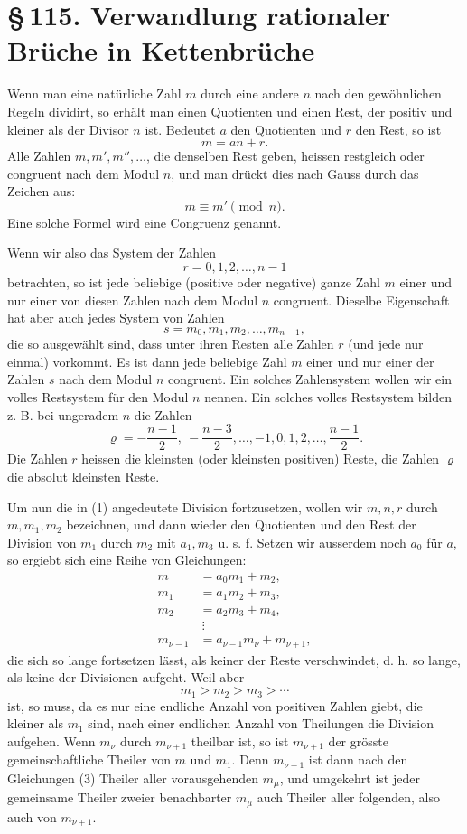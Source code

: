 \documentclass[11pt]{article}
\providecommand{\sect}[2]{\section*{\S\,#1. #2}}
\begin{document}
\sect{115}{Verwandlung rationaler Brüche in Kettenbrüche}

Wenn man eine natürliche Zahl $m$ durch eine andere $n$ nach den gewöhnlichen Regeln dividirt, so erhält man einen Quotienten und einen Rest, der positiv und kleiner als der Divisor $n$ ist. Bedeutet $a$ den Quotienten und $r$ den Rest, so ist
\begin{equation}
        m=an+r.
\tag{1}
\end{equation}
Alle Zahlen $m,m',m'',\ldots$, die denselben Rest geben, heissen restgleich oder congruent nach dem Modul $n$, und man drückt dies nach Gauss durch das Zeichen aus:
\begin{equation}
        m\equiv m'\pmod n.
\tag{2}
\end{equation}
Eine solche Formel wird eine Congruenz genannt.

Wenn wir also das System der Zahlen
\[
        r=0,1,2,\ldots,n-1
\]
betrachten, so ist jede beliebige (positive oder negative) ganze Zahl $m$ einer und nur einer von diesen Zahlen nach dem Modul $n$ congruent. Dieselbe Eigenschaft hat aber auch jedes System von Zahlen
\[
        s=m_0,m_1,m_2,\ldots,m_{n-1},
\]
die so ausgewählt sind, dass unter ihren Resten alle Zahlen $r$ (und jede nur einmal) vorkommt. Es ist dann jede beliebige Zahl $m$ einer und nur einer der Zahlen $s$ nach dem Modul $n$ congruent. Ein solches Zahlensystem wollen wir ein volles Restsystem für den Modul $n$ nennen. Ein solches volles Restsystem bilden z. B. bei ungeradem $n$ die Zahlen
\[
        \varrho=-\frac{n-1}{2},\ -\frac{n-3}{2},\ldots,-1,0,1,2,\ldots,\frac{n-1}{2}.
\]
Die Zahlen $r$ heissen die kleinsten (oder kleinsten positiven) Reste, die Zahlen $\varrho$ die absolut kleinsten Reste.

Um nun die in (1) angedeutete Division fortzusetzen, wollen wir $m,n,r$ durch $m,m_1,m_2$ bezeichnen, und dann wieder den Quotienten und den Rest der Division von $m_1$ durch $m_2$ mit $a_1,m_3$ u. s. f. Setzen wir ausserdem noch $a_0$ für $a$, so ergiebt sich eine Reihe von Gleichungen:
\begin{equation}
\begin{aligned}
m&=a_0m_1+m_2,\\
m_1&=a_1m_2+m_3,\\
m_2&=a_2m_3+m_4,\\
&\ \vdots\\
m_{\nu-1}&=a_{\nu-1}m_\nu+m_{\nu+1},
\end{aligned}
\tag{3}
\end{equation}
die sich so lange fortsetzen lässt, als keiner der Reste verschwindet, d. h. so lange, als keine der Divisionen aufgeht. Weil aber
\[
        m_1>m_2>m_3>\cdots
\]
ist, so muss, da es nur eine endliche Anzahl von positiven Zahlen giebt, die kleiner als $m_1$ sind, nach einer endlichen Anzahl von Theilungen die Division aufgehen. Wenn $m_\nu$ durch $m_{\nu+1}$ theilbar ist, so ist $m_{\nu+1}$ der grösste gemeinschaftliche Theiler von $m$ und $m_1$. Denn $m_{\nu+1}$ ist dann nach den Gleichungen (3) Theiler aller vorausgehenden $m_\mu$, und umgekehrt ist jeder gemeinsame Theiler zweier benachbarter $m_\mu$ auch Theiler aller folgenden, also auch von $m_{\nu+1}$.
\end{document}
